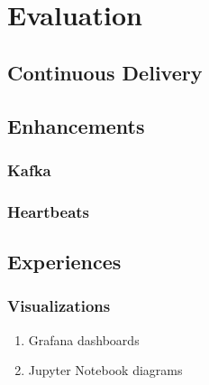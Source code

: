 \chapter{Evaluation}

\section{Continuous Delivery}

\section{Enhancements}

\subsection{Kafka}

\subsection{Heartbeats}

\section{Experiences}

\subsection{Visualizations}

\begin{enumerate}
	\item Grafana dashboards
	\item Jupyter Notebook diagrams
\end{enumerate}